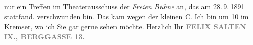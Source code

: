 \begin{ledgroupsized}[t]{13cm}
{{{                  nur ein Treffen im Theaterausschuss der \emph{Freien
                     Bühne} an, das am 28. 9. 1891 stattfand.}}}\label{K_L03106-1h} verschwunden bin. Das kam wegen
               der kleinen C.\pend
           \pstart
           Ich bin um 10 im Kremser, wo ich Sie
               gar gerne sehen {\pb}möchte. \pend
           \pstart  Herzlich Ihr \pend{}\pstart
           \centering{}\textcolor{gray}{\textbf{FELIX SALTEN}}\pend
           \pstart
           \noindent{}\raggedleft{}\textcolor{gray}{\textbf{IX., BERGGASSE 13. }}\pend
           
         
         \endnumbering{}\end{ledgroupsized}\begin{anhang}\end{anhang}\newcommand{\dateiname}{L03106}\newcommand{\titel}{Felix Salten an Arthur Schnitzler, [28. 9. 1891?]}\newcommand{\editorInnen}{Martin Anton Müller und Laura Untner}
      